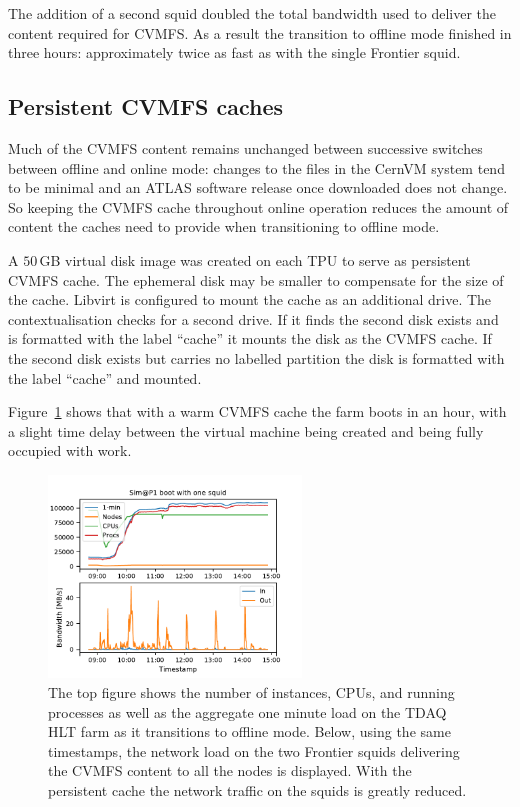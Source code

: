 \documentclass{webofc}
\begin{document}
The addition of a second squid doubled the total bandwidth used to deliver the
content required for CVMFS\@. As a result the transition to offline mode finished
in three hours: approximately twice as fast as with the single Frontier squid.


\subsection{Persistent CVMFS caches}\label{sec:cvmfs}
Much of the CVMFS content remains unchanged between successive switches between
offline and online mode: changes to the files in the CernVM system tend to be
minimal and an ATLAS software release once downloaded does not change. So
keeping the CVMFS cache throughout online operation reduces the
amount of content the caches need to provide when transitioning to offline mode.

A $50$\,\textrm{GB} virtual disk image was created on each TPU to serve as
persistent CVMFS cache. The ephemeral disk may be smaller to
compensate for the size of the cache. Libvirt is configured to mount the cache
as an additional drive. The contextualisation checks for a second drive. If it
finds the second disk exists and is formatted with the label ``cache'' it
mounts the disk as the CVMFS cache. If the second disk exists but carries no
labelled partition the disk is formatted with the label ``cache'' and mounted.

Figure~\ref{fig:persistent_cache} shows that with a warm CVMFS cache the farm
boots in an hour, with a slight time delay between the virtual machine being
created and being fully occupied with work.
\begin{figure}[h]
\centering
\sidecaption\includegraphics[width=0.6\textwidth,clip]{persistent_cache}
\caption{The top figure shows the number of
        instances, CPUs, and running processes as well as the aggregate one
        minute load on the TDAQ HLT farm as it transitions to offline mode.
        Below, using the same timestamps, the network load on the two Frontier
        squids delivering the CVMFS content to all the nodes is displayed. With
        the persistent cache the network traffic on the squids is greatly
        reduced.}\label{fig:persistent_cache}
\end{figure}
\end{document}
